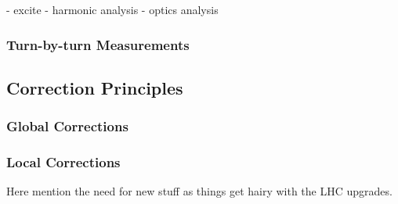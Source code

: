 - excite
- harmonic analysis
- optics analysis

\subsubsection{Turn-by-turn Measurements}

\subsection{Correction Principles}

\subsubsection{Global Corrections}

\subsubsection{Local Corrections}

Here mention the need for new stuff as things get hairy with the LHC upgrades.